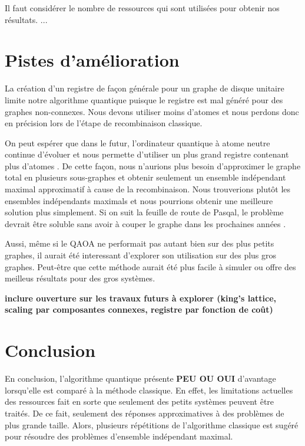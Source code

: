 \documentclass[11pt]{article}
\begin{document}
Il faut considérer le nombre de ressources qui sont utilisées pour obtenir nos résultats. ...

\section{Pistes d'amélioration}


La création d'un registre de façon générale pour un graphe de disque unitaire limite notre algorithme quantique puisque le registre est mal généré pour des graphes non-connexes. Nous devons utiliser moins d'atomes et nous perdons donc en précision lors de l'étape de recombinaison classique. 

On peut espérer que dans le futur, l'ordinateur quantique à atome neutre continue d'évoluer et nous permette d'utiliser un plus grand registre contenant plus d'atomes \cite{noauthor_pasqal_nodate}. De cette façon, nous n'aurions plus besoin d'approximer le graphe total en plusieurs sous-graphes et obtenir seulement un ensemble indépendant maximal approximatif à cause de la recombinaison. Nous trouverions plutôt les ensembles indépendants maximals et nous pourrions obtenir une meilleure solution plus simplement. Si on suit la feuille de route de Pasqal, le problème devrait être soluble sans avoir à couper le graphe dans les prochaines années \cite{noauthor_our_nodate}.

Aussi, même si le QAOA ne performait pas autant bien sur des plus petits graphes, il aurait été interessant d'explorer son utilisation sur des plus gros graphes. Peut-être que cette méthode aurait été plus facile à simuler ou offre des meilleus résultats pour des gros systèmes.


\textbf{inclure ouverture sur les travaux futurs à explorer (king's lattice\cite{kim_quantum_2023}, scaling par composantes connexes\cite{chung_connected_2002}, registre par fonction de coût)}

\section{Conclusion}
En conclusion, l'algorithme quantique présente \textbf{PEU OU OUI} d'avantage lorsqu'elle est comparé à la méthode classique. En effet, les limitations actuelles des ressources fait en sorte que seulement des petits systèmes peuvent être traités. De ce fait, seulement des réponses approximatives à des problèmes de plus grande taille. Alors, plusieurs répétitions de l'algorithme classique est sugéré pour résoudre des problèmes d'ensemble indépendant maximal. 
\end{document}

